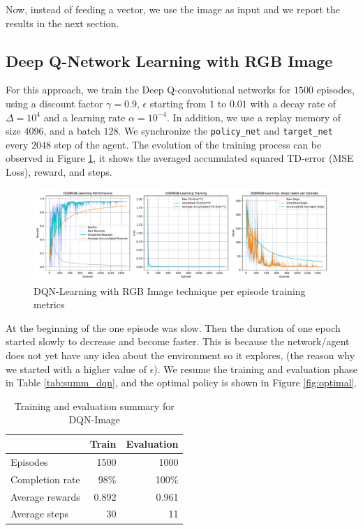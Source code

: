 Now, instead of feeding a vector, we use the image as input and we report the results in the next section.
\subsection{Deep Q-Network Learning with RGB Image}
For this approach, we train the Deep Q-convolutional networks for $1500$ episodes, using a discount factor $\gamma=0.9$, $\epsilon$ starting from $1$ to $0.01$ with a decay rate of $\Delta=10^4$ and a learning rate $\alpha=10^{-4}$. In addition, we use a replay memory of size $4096$, and a batch $128$. We synchronize the \texttt{policy\_net} and \texttt{target\_net} every $2048$ step of the agent. The evolution of the training process can be observed in Figure \ref{fig:dqn-img}, it shows the averaged accumulated squared TD-error (MSE Loss), reward, and steps.
\begin{figure}[H]
	\centering
	\includegraphics[width=\linewidth]{figures/DQNRGBLearning_episode.pdf}
	\caption{DQN-Learning with RGB Image technique per episode training metrics}
	\label{fig:dqn-img}
\end{figure}
At the beginning of the one episode was slow. Then the duration of one epoch started slowly to decrease and become faster. This is because the network/agent does not yet have any idea about the environment so it explores, (the reason why we started with a higher value of $\epsilon$). We resume the training and evaluation phase in Table \ref{tab:summ_dqn}, and the optimal policy is shown in Figure \ref{fig:optimal}.
\begin{table}
	\centering
	\begin{tabular}{@{}lrr@{}}
		\cmidrule(l){2-3}
		& Train & Evaluation \\ \midrule
		Episodes        &  1500      &  1000          \\
		Completion rate &   98\%    &  100\%           \\
		Average rewards &   0.892    &    0.961        \\
		Average steps   &    30   &     11       \\ \bottomrule
	\end{tabular}
	\caption{Training and evaluation summary for DQN-Image}
	\label{tab:summ-dqn-img}
\end{table}

